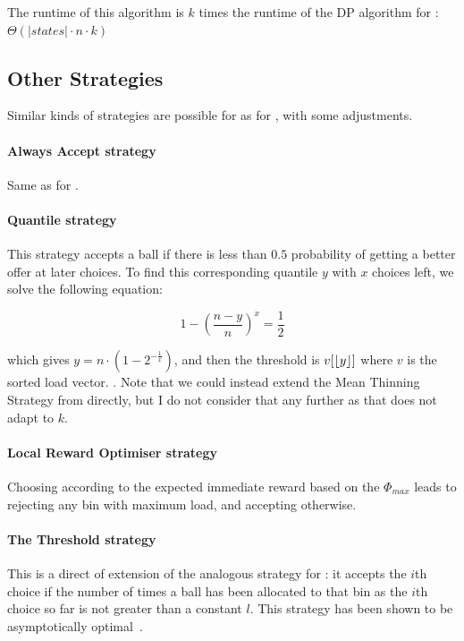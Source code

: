 
The runtime of this algorithm is $k$ times the runtime of the DP algorithm for \TwoThinning: $\Theta(|states|\cdot n\cdot k)$


\subsection{Other Strategies}

Similar kinds of strategies are possible for \KThinning as for \TwoThinning, with some adjustments.

\paragraph{Always Accept strategy} Same as for \TwoThinning.


\paragraph{Quantile strategy} This strategy accepts a ball if there is less than $0.5$ probability of getting a better offer at later choices. To find this corresponding quantile $y$ with $x$ choices left, we solve the following equation:

\begin{equation} \label{quantilekthinning}
1 - (\frac{n-y}{n})^x = \frac{1}{2}
\end{equation}

which gives $y = n \cdot  (1 - 2^{-\frac{1}{x}})$, and then the threshold is $v[\lfloor y\rfloor]$ where $v$ is the sorted load vector. . Note that we could instead extend the Mean Thinning Strategy from \TwoThinning directly, but I do not consider that any further as that does not adapt to $k$.


\paragraph{Local Reward Optimiser strategy} Choosing according to the expected immediate reward based on the $\Phi_{max}$ leads to rejecting any bin with maximum load, and accepting otherwise.


\paragraph{The Threshold strategy} This is a direct of extension of the analogous strategy for \TwoThinning: it accepts the $i$th choice if the number of times a ball has been allocated to that bin as the $i$th choice so far is not greater than a constant $l$. This strategy has been shown to be asymptotically optimal~\cite{feldheim2020dthinning}.


